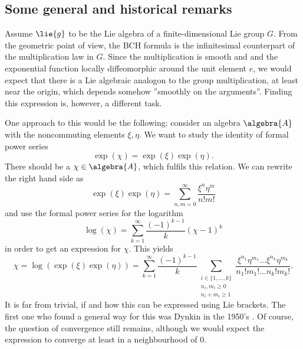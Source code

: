 \subsection{Some general and historical remarks}
Assume $\lie{g}$ to be the Lie algebra of a finite-dimensional Lie group 
$G$. From the geometric point of view, the BCH formula is the infinitesimal 
counterpart of the multiplication law in $G$. Since the multiplication is 
smooth and and the exponential function locally diffeomorphic around the 
unit element $e$, we would expect that there is a Lie algebraic analogon to 
the group multiplication, at least near the origin, which depends somehow 
''smoothly on the arguments''. Finding this expression is, however, a 
different task.


One approach to this would be the following: consider an algebra 
$\algebra{A}$ with the noncommuting elements $\xi, \eta$. We want to study 
the identity of formal power series 
\begin{equation*}
	\exp(\chi)
	=
	\exp(\xi)
	\exp(\eta).
\end{equation*}
There should be a $\chi \in \algebra{A}$, which fulfils this relation. 
We can rewrite the right hand side as
\begin{equation*}
	\exp(\xi)\exp(\eta) 
	= 
	\sum\limits_{n,m=0}^{\infty} 
	\frac{\xi^n \eta^m}{n! m!}
\end{equation*}
and use the formal power series for the logarithm
\begin{equation*}
	\log(\chi) 
	= 
	\sum\limits_{k = 1}^{\infty} 
	\frac{ (-1)^{k-1} }{ k } (\chi - 1)^k
\end{equation*}
in order to get an expression for $\chi$. This yields
\begin{equation}
	\label{Alg:BCHinRaw}
	\chi
	= 
	\log \left( \exp(\xi) \exp(\eta) \right) 
	= 
	\sum\limits_{k = 1}^{\infty} 
	\frac{ (-1)^{k - 1} }{k} 
	\sum\limits_{ \substack{ 
		i \in \{1, \ldots, k\} \\ 
		n_i, m_i \geq 0 \\ n_i + m_i \geq 1
	}}
	\frac{
		\xi^{n_1} \eta^{m_1} 
		\ldots 
		\xi^{n_k} \eta^{m_k}
	}
	{n_1! m_1! \ldots n_k! m_k!}.
\end{equation}
It is far from trivial, if and how this can be expressed using Lie brackets.
The first one who found a general way for this was Dynkin in the 1950's 
\cite{dynkin:1947a, dynkin:1950a}. Of course, the question of convergence 
still remains, although we would expect the expression to converge at least in 
a neighbourhood of $0$.



